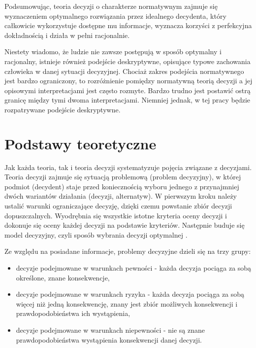 Podsumowując, teoria decyzji o charakterze normatywnym zajmuje się wyznaczeniem 
optymalnego rozwiązania przez idealnego decydenta, który całkowicie wykorzystuje
dostępne mu informacje, wyznacza korzyści z perfekcyjna dokładnością i działa w 
pełni racjonalnie.

Niestety wiadomo, że ludzie nie zawsze postępują w sposób optymalny i
racjonalny,  istnieje również podejście deskryptywne, opisujące typowe 
zachowania człowieka w danej sytuacji decyzyjnej. Chociaż zakres podejścia 
normatywnego jest bardzo ograniczony, to rozróżnienie pomiędzy normatywną 
teorią decyzji a jej opisowymi interpretacjami jest często rozmyte. Bardzo 
trudno jest postawić ostrą granicę między tymi dwoma interpretacjami. Niemniej 
jednak, w tej pracy będzie rozpatrywane podejście deskryptywne.

\section{Podstawy teoretyczne}
Jak każda teoria, tak i teoria decyzji systematyzuje pojęcia związane z 
decyzjami. Teoria decyzji zajmuje się sytuacją problemową (problem decyzyjny), 
w której podmiot (decydent) staje przed koniecznością wyboru jednego z 
przynajmniej dwóch wariantów działania (decyzji, alternatyw). W pierwszym kroku 
należy ustalić warunki ograniczające decyzję, dzięki czemu powstanie zbiór 
decyzji dopuszczalnych. Wyodrębnia się wszystkie istotne kryteria oceny decyzji 
i dokonuje się oceny każdej decyzji na podstawie kryteriów. Następnie buduje 
się model decyzyjny, czyli sposób wybrania decyzji optymalnej \cite{Anand1995}.

Ze względu na posiadane informacje, problemy decyzyjne dzieli się na trzy grupy:
\begin{itemize}
  \item decyzje podejmowane w warunkach pewności - każda decyzja pociąga za 
  sobą określone, znane konsekwencje,
  
  \item decyzje podejmowane w warunkach ryzyka - każda decyzja pociąga za sobą 
  więcej niż jedną konsekwencję, znany jest zbiór możliwych konsekwencji i
  prawdopodobieństwa ich wystąpienia, 
  
  \item decyzje podejmowane w warunkach niepewności - nie są znane 
  prawdopodobieństwa wystąpienia konsekwencji danej decyzji.

\end{itemize}

